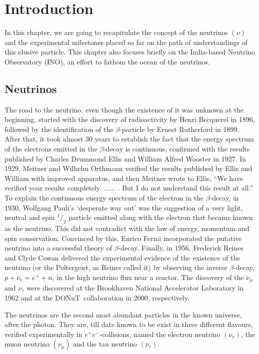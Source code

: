 \chapter{Introduction}
In this chapter, we are going to recapitulate the concept of the
neutrinos $\left(\nu\right)$ and the experimental milestones placed
so far on the path of understandings of this elusive particle. This
chapter also focuses briefly on the India-based Neutrino Observatory
(INO), an effort to fathom the ocean of the neutrinos.

\section{Neutrinos}
The road to the neutrino\cite{roadtoneut}, even though the existence
of it was unknown at the beginning, started with the discovery of
radioactivity by Henri Becquerel in 1896\cite{becquerel1896}, followed
by the identification of the $\beta$-particle by Ernest Rutherford in
1899\cite{rutherford1899}. After that, it took almost 30 years to
establish the fact that the energy spectrum of the electrons emitted
in the $\beta$-decay is continuous, confirmed with the results
published by Charles Drummond Ellis and William Alfred Wooster
in 1927\cite{ellis1927}. In 1929, Meitner and Wilhelm Orthmann
verified the results published by Ellis and William with improved
apparatus\cite{meitner1930}, and then Meitner wrote to Ellis,
``We have verified your results completely. ...... . But I do not understand this result at all.''\cite{lettertoCD}
To explain the continuous energy spectrum of the electron in the
$\beta$-decay, in 1930, Wolfgang Pauli's `desperate way out' was the
suggestion of a very light, neutral and spin $^1/_2$ particle emitted
along with the electron that became known as the neutrino. This did
not contradict with the law of energy, momentum and spin conservation.
Convinced by this, Enrico Fermi incorporated the putative neutrino
into a successful theory of $\beta$-decay. Finally, in 1956, Frederick
Reines and Clyde Cowan delivered the experimental evidence of the
existence of the neutrino (or the Poltergeist, as Reines called it)
by observing the inverse $\beta$-decay, $p+\overline{\nu}_e=e^++n$,
in the high neutrino flux near a reactor\cite{reines1956}.
The discovery of the $\nu_{\mu}$ and $\nu_{\tau}$ were discovered at
the Brookhaven National Accelerator Laboratory in
1962\cite{muonneut1962} and at the DONuT~collaboration in
2000\cite{tauneut2001}, respectively.

The neutrinos are the second most abundant particles in the known
universe, after the photon. They are, till date known to be exist
in three different flavours, verified experimentally in
\mbox{$e^+e^-$-collisions\cite{numberneut}}, named the electron
neutrino $\left(\nu_e\right)$, the muon neutrino
$\left(\nu_{\mu}\right)$ and the tau neutrino $\left(\nu_{\tau}\right)$.

